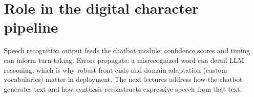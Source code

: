 \section{Role in the digital character pipeline}

Speech recognition output feeds the chatbot module; confidence scores and timing can inform turn-taking. Errors propagate: a misrecognized word can derail LLM reasoning, which is why robust front-ends and domain adaptation (custom vocabularies) matter in deployment. The next lectures address how the chatbot generates text and how synthesis reconstructs expressive speech from that text.

